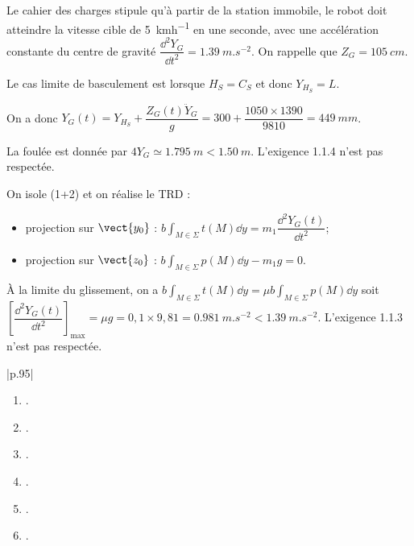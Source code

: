 \begin{multicols}{2}
Le cahier des charges stipule qu'à partir de la station immobile, le robot doit atteindre la vitesse cible de \SI{5}{kmh^{-1}} en une seconde, avec une accélération constante du centre de gravité $\dfrac{\dd^2 Y_G}{\dd t^2}=\SI{1,39}{m.s^{-2}}$.
On rappelle que $Z_G=\SI{105}{cm}$.

\fi


\ifprof
\begin{corrige}
Le cas limite de basculement est lorsque $H_S=C_S$ et donc $Y_{H_S}=L$. 

On a donc $Y_G(t) = Y_{H_S} + \dfrac{ Z_G(t) \ddot{Y}_G}{g} = 300+\dfrac{1050\times1390}{9 810} = \SI{449}{mm} $.

La foulée est donnée par $4Y_G\simeq  \SI{1,795}{m}<\SI{1,50}{m}$. L'exigence 1.1.4 n'est pas respectée.
\end{corrige}
\else
\fi



\ifprof
\begin{corrige}

On isole (1+2) et on réalise le TRD :
\begin{itemize}
\item projection sur $\vect{y_0}$ : $b\int_{M\in\Sigma}t(M) \dd y= m_1 \dfrac{\dd^2 Y_G(t)}{\dd t^2}$;

\item projection sur $\vect{z_0}$ : $b\int_{M\in\Sigma}p(M) \dd y - m_1 g  = 0$.
\end{itemize}

À la limite du glissement, on a $b\int_{M\in\Sigma}t(M) \dd y= \mu b\int_{M\in\Sigma}p(M) \dd y$ soit 
$\left[\dfrac{\dd^2 Y_G(t)}{\dd t^2}\right]_{\text{max}} = \mu  g = 0,1\times 9,81 = \SI{0,981}{m.s^{-2}} < \SI{1,39}{m.s^{-2}}$. L'exigence 1.1.3 n'est pas respectée. 
\end{corrige}
\else
\fi



\ifprof
\else

\footnotesize
\begin{tabular}{|p.{95\linewidth}|}
\hline
\begin{enumerate}
\item .
\item .
\item .
\item .
\item .
\item .
\end{enumerate}
\\
\hline
\end{tabular}
\normalsize
\end{multicols}
\fi

